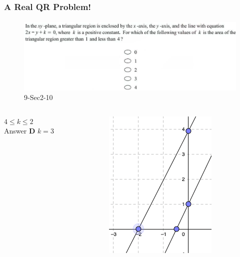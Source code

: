 \documentclass[
	11pt, %
]{beamer}
\begin{document}
\begin{frame}
	\frametitle{A Real QR Problem!}
	\framesubtitle{}
	\begin{figure}
		\includegraphics[width=\linewidth]{Graphing_Linear_Equations_Example_Question2.png}
		\caption{9-Sec2-10}
	\end{figure}

	\begin{columns}[t] 
		\begin{column}{0.45\textwidth} %
			\pause
			$4\leq k \leq 2$\\
			\pause
			\bigskip
			Answer \textbf{D} $k=3$ 
		\end{column}
		\begin{column}{0.2\textwidth} %
			\begin{figure}
				\includegraphics[width=0.5\linewidth]{Graphing_Linear_Equations_Example_Question2_1.png}
			\end{figure}
    \end{column}
	\end{columns}
\end{frame}

\end{document}
